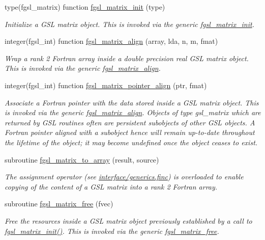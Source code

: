 \begin{DoxyCompactItemize}
type(fgsl\-\_\-matrix) function \hyperlink{array_8finc_af93d762ccde0b58b767c72579cbfb3cb}{fgsl\-\_\-matrix\-\_\-init} (type)
\begin{DoxyCompactList}\small\item\em Initialize a G\-S\-L matrix object. This is invoked via the generic \hyperlink{interfacefgsl__matrix__init}{fgsl\-\_\-matrix\-\_\-init}. \end{DoxyCompactList}\item 
integer(fgsl\-\_\-int) function \hyperlink{array_8finc_ae0c19c4453ce18db5e6415a047c3a59e}{fgsl\-\_\-matrix\-\_\-align} (array, lda, n, m, fmat)
\begin{DoxyCompactList}\small\item\em Wrap a rank 2 Fortran array inside a double precision real G\-S\-L matrix object. This is invoked via the generic \hyperlink{interfacefgsl__matrix__align}{fgsl\-\_\-matrix\-\_\-align}. \end{DoxyCompactList}\item 
integer(fgsl\-\_\-int) function \hyperlink{array_8finc_a54b17f056b272b74ae425a588e4653d5}{fgsl\-\_\-matrix\-\_\-pointer\-\_\-align} (ptr, fmat)
\begin{DoxyCompactList}\small\item\em Associate a Fortran pointer with the data stored inside a G\-S\-L matrix object. This is invoked via the generic \hyperlink{interfacefgsl__matrix__align}{fgsl\-\_\-matrix\-\_\-align}. Objects of type {\ttfamily gsl\-\_\-matrix} which are returned by G\-S\-L routines often are persistent subobjects of other G\-S\-L objects. A Fortran pointer aligned with a subobject hence will remain up-\/to-\/date throughout the lifetime of the object; it may become undefined once the object ceases to exist. \end{DoxyCompactList}\item 
subroutine \hyperlink{array_8finc_a44e06325d8b322997dcf6ab28417dd4f}{fgsl\-\_\-matrix\-\_\-to\-\_\-array} (result, source)
\begin{DoxyCompactList}\small\item\em The assignment operator (see \hyperlink{generics_8finc}{interface/generics.\-finc}) is overloaded to enable copying of the content of a G\-S\-L matrix into a rank 2 Fortran array. \end{DoxyCompactList}\item 
subroutine \hyperlink{array_8finc_a0b551f436f076593a8a828cd266e372d}{fgsl\-\_\-matrix\-\_\-free} (fvec)
\begin{DoxyCompactList}\small\item\em Free the resources inside a G\-S\-L matrix object previously established by a call to \hyperlink{array_8finc_af93d762ccde0b58b767c72579cbfb3cb}{fgsl\-\_\-matrix\-\_\-init()}. This is invoked via the generic \hyperlink{interfacefgsl__matrix__free}{fgsl\-\_\-matrix\-\_\-free}. \end{DoxyCompactList}\item 

\end{DoxyCompactItemize}
